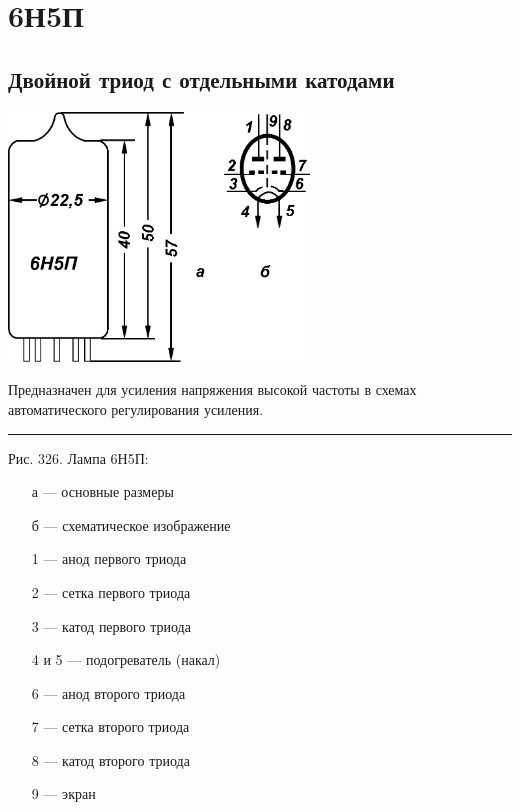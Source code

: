 \documentclass[12pt]{article}
\begin{document}
    \section*{6Н5П}
    \subsection*{Двойной триод с отдельными катодами}
    
    \par
    \begin{minipage}[b][0mm][t]{0.45\textwidth}
        \includegraphics[width=80mm]{symbol.png}
    \end{minipage}
    \begin{minipage}[b][0mm][t]{0.45\textwidth}
        \begin{raggedright}
            \quad Предназначен для усиления напряжения высокой частоты в схемах автоматического регулирования усиления.
            \vspace{2mm}
            \hrule
            \vspace{2mm}
            Рис. 326. Лампа 6Н5П:
            \vspace{-4mm}
            \begin{itemize} \setlength \itemsep{-2.25mm}
                \item[а] --- основные размеры
                \item[б] --- схематическое изображение
                \item[1] --- анод первого триода
                \item[2] --- сетка первого триода
                \item[3] --- катод первого триода
                \item[4 и 5] --- подогреватель (накал)
                \item[6] --- анод второго триода
                \item[7] --- сетка второго триода
                \item[8] --- катод второго триода
                \item[9] --- экран
            \end{itemize}
        \end{raggedright}
    \end{minipage}
    
\end{document}

